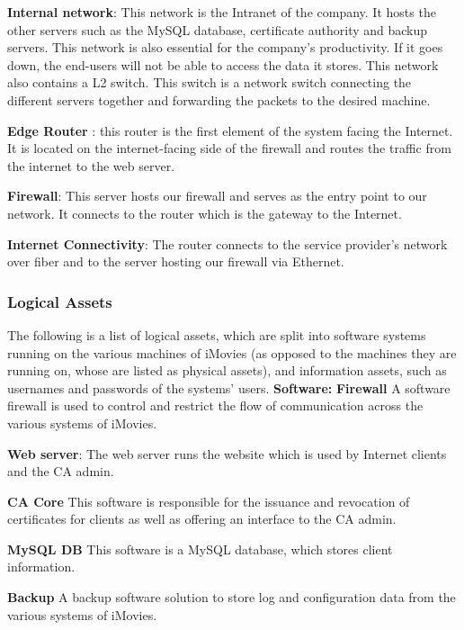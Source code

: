 \documentclass[english]{article}
\begin{document}
\textbf{Internal network}: This network is the Intranet of the company. It hosts the other servers such as the MySQL database, certificate authority and backup servers. This network is also essential for the company's productivity. If it goes down, the end-users will not be able to access the data it stores. This network also contains a L2 switch. This switch is a network switch connecting the different servers together and forwarding the packets to the desired machine.

\textbf{Edge Router} : this router is the first element of the system facing the Internet. It is located on the internet-facing side of the firewall and routes the traffic from the internet to the web server. 

\textbf{Firewall}: This server hosts our firewall and serves as the entry point to our network. It connects to the router which is the gateway to the Internet.

\textbf{Internet Connectivity}: The router connects to the service provider’s network over fiber and to the server hosting our firewall via Ethernet.

\subsubsection{Logical Assets}

The following is a list of logical assets, which are split into software systems running on the various machines of iMovies (as opposed to the machines they are running on, whose are listed as physical assets), and information assets, such as usernames and passwords of the systems' users.
\newline
\textbf{Software:}
\newline
\textbf{Firewall} A software firewall is used to control and restrict the flow of communication across the various systems of iMovies.

\textbf{Web server}: The web server runs the website which is used by Internet clients and the CA admin.

\textbf{CA Core} This software is responsible for the issuance and revocation of certificates for clients as well as offering an interface to the CA admin.

\textbf{MySQL DB} This software is a MySQL database, which stores client information.

\textbf{Backup} A backup software solution to store log and configuration data from the various systems of iMovies.
\end{document}
